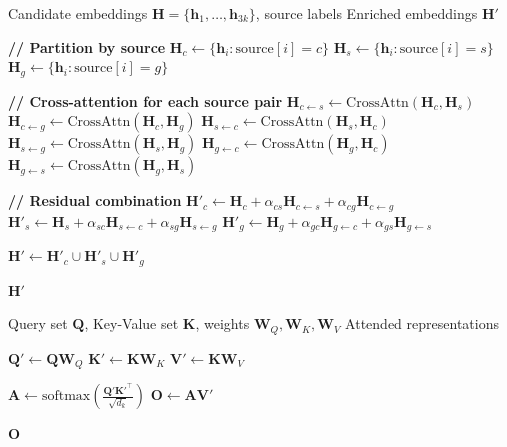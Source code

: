 \documentclass[11pt]{article}
\begin{document}
\begin{algorithm}[H]
\caption{BidirectionalCrossAttention}
\label{alg:crossattn}
\begin{algorithmic}[1]
\REQUIRE Candidate embeddings $\mathbf{H} = \{\mathbf{h}_1, \ldots, \mathbf{h}_{3k}\}$, source labels
\ENSURE Enriched embeddings $\mathbf{H}'$

\STATE \textbf{// Partition by source}
\STATE $\mathbf{H}_c \leftarrow \{\mathbf{h}_i : \text{source}[i] = c\}$ 
\STATE $\mathbf{H}_s \leftarrow \{\mathbf{h}_i : \text{source}[i] = s\}$ 
\STATE $\mathbf{H}_g \leftarrow \{\mathbf{h}_i : \text{source}[i] = g\}$ 

\STATE
\STATE \textbf{// Cross-attention for each source pair}
\STATE $\mathbf{H}_{c \leftarrow s} \leftarrow \text{CrossAttn}(\mathbf{H}_c, \mathbf{H}_s)$ 
\STATE $\mathbf{H}_{c \leftarrow g} \leftarrow \text{CrossAttn}(\mathbf{H}_c, \mathbf{H}_g)$ 
\STATE $\mathbf{H}_{s \leftarrow c} \leftarrow \text{CrossAttn}(\mathbf{H}_s, \mathbf{H}_c)$
\STATE $\mathbf{H}_{s \leftarrow g} \leftarrow \text{CrossAttn}(\mathbf{H}_s, \mathbf{H}_g)$
\STATE $\mathbf{H}_{g \leftarrow c} \leftarrow \text{CrossAttn}(\mathbf{H}_g, \mathbf{H}_c)$
\STATE $\mathbf{H}_{g \leftarrow s} \leftarrow \text{CrossAttn}(\mathbf{H}_g, \mathbf{H}_s)$

\STATE
\STATE \textbf{// Residual combination}
\STATE $\mathbf{H}'_c \leftarrow \mathbf{H}_c + \alpha_{cs} \mathbf{H}_{c \leftarrow s} + \alpha_{cg} \mathbf{H}_{c \leftarrow g}$
\STATE $\mathbf{H}'_s \leftarrow \mathbf{H}_s + \alpha_{sc} \mathbf{H}_{s \leftarrow c} + \alpha_{sg} \mathbf{H}_{s \leftarrow g}$
\STATE $\mathbf{H}'_g \leftarrow \mathbf{H}_g + \alpha_{gc} \mathbf{H}_{g \leftarrow c} + \alpha_{gs} \mathbf{H}_{g \leftarrow s}$

\STATE $\mathbf{H}' \leftarrow \mathbf{H}'_c \cup \mathbf{H}'_s \cup \mathbf{H}'_g$

\RETURN $\mathbf{H}'$
\end{algorithmic}
\end{algorithm}

\begin{algorithm}[H]
\caption{CrossAttn: Single Cross-Attention Layer}
\label{alg:single_crossattn}
\begin{algorithmic}[1]
\REQUIRE Query set $\mathbf{Q}$, Key-Value set $\mathbf{K}$, weights $\mathbf{W}_Q, \mathbf{W}_K, \mathbf{W}_V$
\ENSURE Attended representations

\STATE $\mathbf{Q}' \leftarrow \mathbf{Q} \mathbf{W}_Q$ 
\STATE $\mathbf{K}' \leftarrow \mathbf{K} \mathbf{W}_K$ 
\STATE $\mathbf{V}' \leftarrow \mathbf{K} \mathbf{W}_V$ 

\STATE $\mathbf{A} \leftarrow \text{softmax}\left(\frac{\mathbf{Q}' {\mathbf{K}'}^\top}{\sqrt{d_k}}\right)$ 
\STATE $\mathbf{O} \leftarrow \mathbf{A} \mathbf{V}'$ 

\RETURN $\mathbf{O}$
\end{algorithmic}
\end{algorithm}
\end{document}
